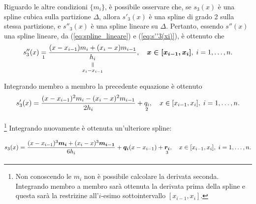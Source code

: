 Riguardo le altre condizioni $\{m_i\}$, è possibile osservare che, se $s_3(x)$ è una spline cubica sulla partizione $\Delta$, allora $s'_3(x)$ è una spline di grado 2 sulla stessa partizione, e $s''_3(x)$ è una spline lineare su $\Delta$. Pertanto, essendo $s''(x)$ una spline lineare, da (\ref{eq:spline_lineare}) e (\ref{eq:s''3(xi)}), è ottenuto che
\begin{equation*}
    s''_3(x)\underset{\footnotemark}{=}\frac{(x-x_{i-1})m_i+(x_i-x)m_{i-1}}{\equalto{h_i}{x_i-x_{i-1}}},\quad\boldsymbol{x\in[x_{i-1}, x_i]},\; i=1,\hdots,n.
\end{equation*}

Integrando membro a membro la precedente equazione è ottenuto
\begin{equation}\label{eq:s'_3(x)}
    s'_3(x)=\frac{(x-x_{i-1})^2m_i-(x_i-x)^2m_{i-1}}{2h_i}+\underset{\footnotemark}{q_i},\quad x\in [x_{i-1}, x_i],\; i=1,\hdots,n.
\end{equation}

\noindent\footnote{Non conoscendo le $m_i$ non è possibile calcolare la derivata seconda. Integrando membro a membro sarà ottenuta la derivata prima della spline e questa sarà la restrizine all'$i$-esimo sottointervallo $[x_{i-1},x_i]$.}
Integrando nuovamente è ottenuta un'ulteriore spline:

\begin{equation}\label{eq:s3Ign}
    s_3(x)=\frac{(x-x_{i-1})^3\boldsymbol{m_i}+(x_i-x)^3\boldsymbol{m_{i-1}}}{6h_i}+\boldsymbol{q_i}(x-x_{i-1})+\underset{\footnotemark}{\boldsymbol{r_i}},\quad x\in[x_{i-1},x_i],\; i=1,\hdots,n.
\end{equation}


